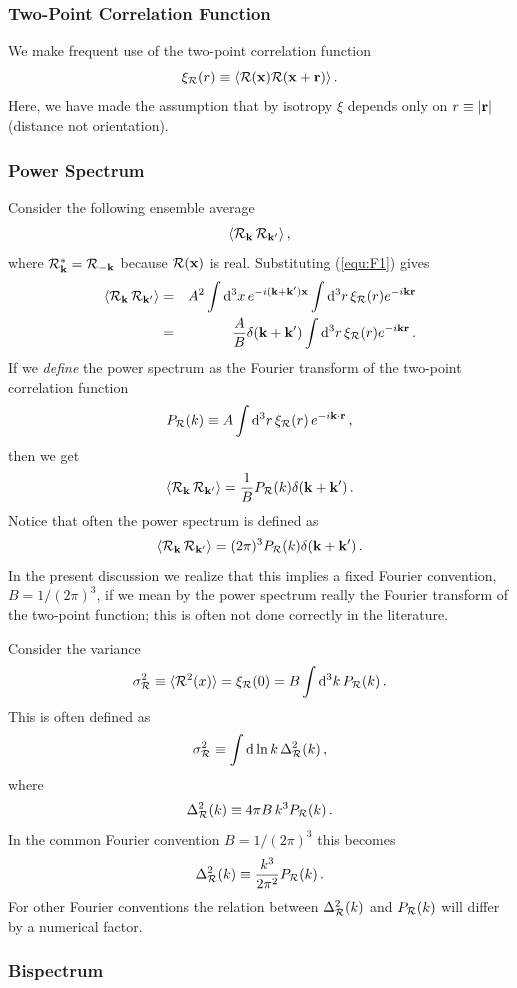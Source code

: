 \documentclass[12pt,letterpaper,rotate]{article}
\def\beq{\begin{equation}}
\def\eeq{\end{equation}}
\def\bea{\begin{eqnarray}}
\def\eea{\end{eqnarray}}
\def\d{{\rm d}}
\def\R{{\cal R}}
\begin{document}
{\subsubsection{Two-Point Correlation Function}

We make frequent use of the two-point correlation function
\beq
\xi_\R(r) \equiv \langle \R({\bf x}) \R({\bf x}+ {\bf r}) \rangle \, .
\eeq
Here, we have made the assumption that by isotropy $\xi$ depends only on $r \equiv |{\bf r}|$ (distance not orientation).

\subsubsection{Power Spectrum}

Consider the following ensemble average
\beq
\langle \R_{{\bf k}}\, \R_{{\bf k}'}\rangle \, ,
\eeq
where $\R^*_{\bf k} = \R_{-{\bf k}}$ because $\R({\bf x})$ is real.
Substituting (\ref{equ:F1}) gives
\bea
\langle \R_{{\bf k}}\, \R_{{\bf k}'}\rangle &=&  A^2 \int \d^3 x \, e^{ -i ({\bf k}+{\bf k}') {\bf x}} \int \d^3 r\, \xi_\R(r) e^{-i {\bf k} {\bf r}} \\
&=& \frac{A}{B} \delta({\bf k} + {\bf k}') \int \d^3 r \, \xi_\R(r) e^{-i {\bf k} {\bf r}} \, .
\eea
If we {\it define} the power spectrum as the Fourier transform of the two-point correlation function
\beq
P_\R(k) \equiv  A \int \d^3 r \, \xi_\R(r) \, e^{-i {\bf k} \cdot {\bf r}}\, ,
\eeq
then we get
\beq
\langle \R_{{\bf k}}\, \R_{{\bf k}'}\rangle  = \frac{1}{B} P_\R(k) \delta({\bf k} + {\bf k}') \, .
\eeq
Notice that often the power spectrum is defined as
\beq
\langle \R_{{\bf k}}\, \R_{{\bf k}'}\rangle = (2\pi)^3 P_\R(k) \delta({\bf k} + {\bf k}')\, .
\eeq
In the present discussion we realize that this implies a fixed Fourier convention, $B=1/(2\pi)^3$, if we mean by the power spectrum really the Fourier transform of the two-point function; this is often not done correctly in the literature.


Consider the variance
\beq
\sigma^2_\R \equiv \langle \R^2(x) \rangle = \xi_\R(0) = B \int \d^3 k\, P_\R(k)\, .
\eeq
This is often defined as 
\beq
\sigma_\R^2 \equiv \int \d \ln k \, \Delta^2_\R(k)\, ,
\eeq
where
\beq
\Delta_\R^2(k) \equiv 4\pi B \, k^3 P_\R(k)\, .
\eeq
In the common Fourier convention $B=1/(2\pi)^3$ this becomes
\beq
\Delta_\R^2(k) \equiv \frac{k^3}{2\pi^2} P_\R(k)\, .
\eeq
For other Fourier conventions the relation between $\Delta_\R^2(k)$ and $P_\R(k)$ will differ by a numerical factor.

\subsubsection{Bispectrum}

}
\end{document}
